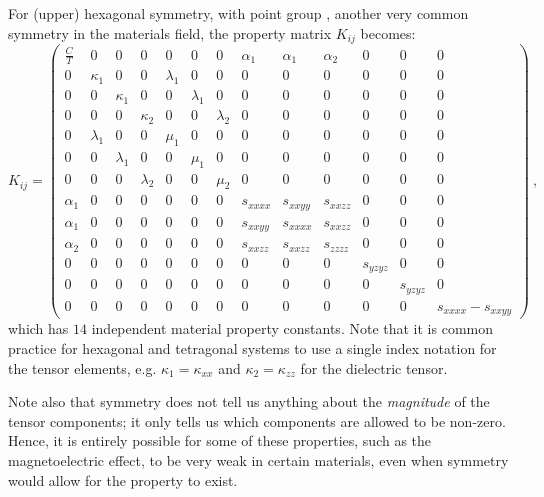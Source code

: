 \vfill
\newpage
For (upper) hexagonal symmetry, with point group , another very common symmetry in the materials field, the property matrix $K_{ij}$ becomes:
{\small\begin{equation}
	K_{ij} = 
	\left(\begin{array}{c|ccc|ccc|cccccc}
	\frac{C}{T} & 0 & 0 & 0 & 0 & 0 & 0 & \alpha_{1} & \alpha_{1} & \alpha_{2} & 0 & 0 &0\\\hline
	0 & \kappa_{1} & 0 & 0 & \lambda_{1} & 0 & 0  & 0 & 0 & 0 & 0 & 0 & 0\\
	0 & 0 & \kappa_{1} & 0 & 0 & \lambda_{1} & 0 & 0 & 0 & 0 & 0 & 0 & 0\\
	0 & 0 & 0 & \kappa_{2} & 0 & 0 & \lambda_{2}                   & 0 & 0 & 0 & 0 & 0 & 0\\\hline
	0 & \lambda_{1} & 0   & 0 & \mu_{1} & 0 & 0  &0 & 0 & 0 & 0 & 0 & 0\\
	0 & 0 & \lambda_{1}    & 0 & 0 & \mu_{1} & 0  &0 &0 & 0 & 0 & 0 & 0\\
	0 & 0 & 0 & \lambda_{2}                      & 0 & 0 & \mu_{2} &0 & 0 & 0 & 0 & 0 & 0\\\hline
	\alpha_{1} & 0 & 0 & 0     & 0 & 0 & 0                      & s_{xxxx} & s_{xxyy} & s_{xxzz} & 0 & 0 & 0\\
	\alpha_{1} & 0 & 0 & 0    & 0 & 0 & 0                       & s_{xxyy} & s_{xxxx} & s_{xxzz} & 0 & 0 & 0\\
	\alpha_{2} & 0 & 0 & 0    & 0 & 0 & 0                       & s_{xxzz} & s_{xxzz} & s_{zzzz} & 0 & 0 & 0\\
	0 & 0 & 0 & 0               & 0 & 0 & 0                                & 0 & 0 & 0 & s_{yzyz} & 0 & 0\\
	0 & 0 & 0 & 0 & 0 & 0 & 0      & 0 & 0 & 0                                         & 0 & s_{yzyz} & 0\\
	0 & 0 & 0 & 0 & 0 & 0 & 0      & 0 & 0 & 0                                         & 0 & 0 & s_{xxxx}-s_{xxyy}
	\end{array}\right)\ ,
\end{equation}}
which has $14$ independent material property constants.  Note that it is common practice for hexagonal and tetragonal systems to use a single index notation for the tensor elements, e.g. $\kappa_1=\kappa_{xx}$ and $\kappa_2=\kappa_{zz}$ for the dielectric tensor.

Note also that symmetry does not tell us anything about the \textit{magnitude} of the tensor components; it only tells us which components are allowed to be non-zero. Hence, it is entirely possible for some of these properties, such as the magnetoelectric effect, to be very weak in certain materials, even when symmetry would allow for the property to exist.

